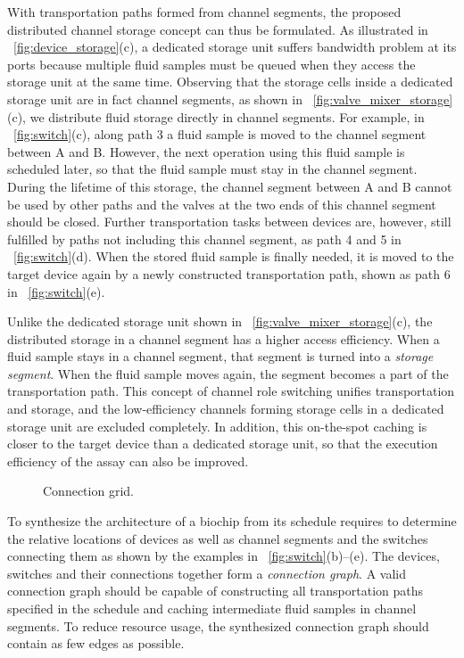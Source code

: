 With transportation paths formed from channel segments, the proposed
distributed channel storage concept can thus be formulated.
As illustrated in \figname~\ref{fig:device_storage}(c),
a dedicated storage unit suffers bandwidth problem at its ports
because multiple fluid samples must be queued when they access the storage unit
at the same time.
Observing that the storage cells
inside a dedicated storage unit
are in fact channel segments, as shown in
\figname~\ref{fig:valve_mixer_storage}(c), we distribute fluid storage
directly in channel segments. For example, in
\figname~\ref{fig:switch}(c), along path 3 a fluid sample is moved to the channel
segment between A and B. However, the next operation using this
fluid sample is scheduled later, so that the fluid sample must stay in the
channel segment. During the lifetime of this storage, the channel segment
between A and B cannot
be used by other paths
and the valves at the two ends of this channel segment should be closed.
Further transportation tasks between devices are, however, still
fulfilled by paths not including this channel segment,
as path 4 and 5 in \figname~\ref{fig:switch}(d).
When the stored fluid sample is finally needed, it is moved to the target
device again by a newly constructed transportation path, shown as path 6
in \figname~\ref{fig:switch}(e).

Unlike the dedicated storage unit shown in
\figname~\ref{fig:valve_mixer_storage}(c), the distributed storage in a
channel segment has a higher access efficiency.
When a fluid sample stays in a channel segment,
that segment is turned into a \textit{storage segment}. When the
fluid sample moves again, the segment becomes a part of
the transportation path. This concept of channel role switching
unifies transportation and storage,
and
the low-efficiency channels forming storage cells
in a dedicated storage unit are excluded completely.
In addition, this on-the-spot caching is closer to the target
device than a dedicated storage unit, so that the execution efficiency of
the assay can also be improved.

\begin{figure}[t]
{\figurefontsize
\centering

\caption{Connection grid.}
\label{fig:grid_model}
}
\end{figure}

To synthesize the architecture of a biochip from its schedule requires to
determine the relative locations of devices
as well as channel segments and the switches connecting them as shown by the examples
in  \figname~\ref{fig:switch}(b)--(e). The devices, switches and their connections together form a
\textit{connection graph}. %
A valid connection graph should be capable of
constructing all transportation paths specified in the schedule and caching
intermediate fluid samples in channel segments.
To reduce resource usage, the synthesized connection graph
should contain as few edges as possible.

